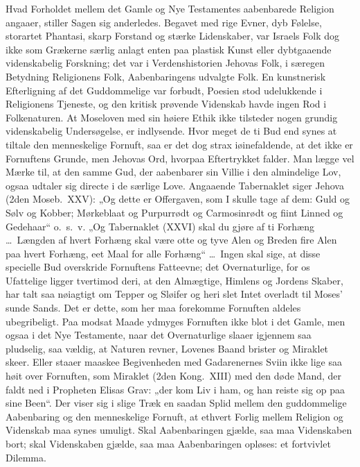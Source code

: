\documentclass[12pt,a4paper]{article}
\newcommand{\opage}[1]{\marginnote{\footnotesize\textit{[#1]}}}
\begin{document}
Hvad Forholdet mellem det Gamle og Nye Testamentes aabenbarede Religion
angaaer, stiller Sagen sig anderledes. Begavet med rige Evner, dyb
Følelse, storartet Phantasi, skarp Forstand og stærke Lidenskaber, var
Israels Folk dog ikke som Grækerne særlig anlagt enten paa plastisk
Kunst eller dybtgaaende videnskabelig Forskning; det var i
Verdenshistorien Jehovas Folk, i særegen Betydning Religionens Folk,
Aabenbaringens udvalgte Folk. En kunstnerisk Efterligning af det
Guddommelige var forbudt, Poesien stod udelukkende i Religionens
Tjeneste, og den kritisk prøvende Videnskab havde ingen Rod i
Folkenaturen. At Moseloven med sin høiere Ethik ikke tilsteder nogen
grundig videnskabelig Undersøgelse, er indlysende. Hvor meget de ti
Bud end synes at tiltale den menneskelige Fornuft, saa er det dog strax
iøinefaldende, at det ikke er Fornuftens Grunde, men Jehovas Ord,
hvorpaa Eftertrykket falder. Man lægge vel Mærke til, at den samme
Gud, der aabenbarer sin Villie i den almindelige Lov, ogsaa udtaler sig
directe i de særlige Love.
Angaaende Tabernaklet siger Jehova (2den Moseb.\ XXV): „Og dette er
Offergaven, som I skulle tage af dem: Guld og Sølv og Kobber; Mørkeblaat
og Purpurrødt og Carmosinrødt og fiint Linned og Gedehaar“ o.\ s.\ v.
„Og Tabernaklet (XXVI) skal du gjøre af ti Forhæng \ldots\ Længden af
hvert Forhæng skal være otte og tyve Alen og Breden fire Alen paa hvert
Forhæng, eet Maal for alle Forhæng“ \ldots\ Ingen skal sige, at disse
specielle Bud overskride Fornuftens Fatteevne; det Overnaturlige, for
os Ufattelige ligger tvertimod deri, at den Almægtige, Himlens og
Jordens Skaber, har talt saa nøiagtigt om Tepper og Sløifer og heri
slet Intet overladt til Moses' sunde Sands. Det er dette, som her maa
forekomme Fornuften aldeles ubegribeligt. Paa modsat Maade ydmyges
Fornuften ikke blot i det Gamle, men ogsaa i det Nye Testamente, naar
det Overnaturlige slaaer igjennem saa pludselig, saa vældig, at Naturen
revner, Lovenes Baand brister og Miraklet \opage{3} skeer. Eller staaer maaskee
Begivenheden med Gadarenernes Sviin ikke lige saa høit over Fornuften,
som Miraklet (2den Kong.\ XIII) med den døde Mand, der faldt ned i
Propheten Elisas Grav: „der kom Liv i ham, og han reiste sig op paa
sine Been“. Der viser sig i slige Træk en saadan Splid mellem den
guddommelige Aabenbaring og den menneskelige Fornuft, at ethvert
Forlig mellem Religion og Videnskab maa synes umuligt. Skal
Aabenbaringen gjælde, saa maa Videnskaben bort; skal Videnskaben
gjælde, saa maa Aabenbaringen opløses: et fortvivlet Dilemma.
\end{document}
